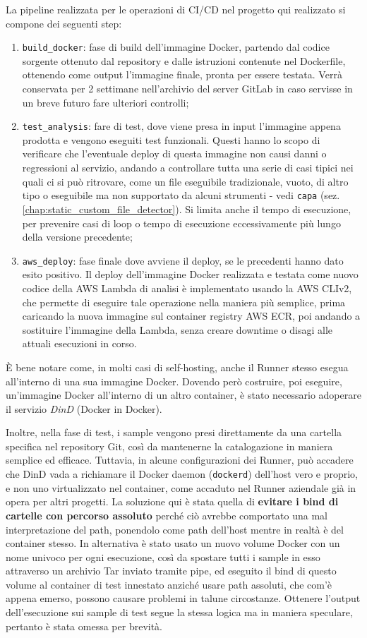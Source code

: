 La pipeline realizzata per le operazioni di CI/CD nel progetto qui realizzato si compone dei seguenti step:
\begin{enumerate}
    \item \texttt{build\_docker}: fase di build dell'immagine Docker, partendo dal codice sorgente ottenuto dal repository e dalle istruzioni contenute nel Dockerfile, ottenendo come output l'immagine finale, pronta per essere testata. Verrà conservata per 2 settimane nell'archivio del server GitLab in caso servisse in un breve futuro fare ulteriori controlli;
    \item \texttt{test\_analysis}: fare di test, dove viene presa in input l'immagine appena prodotta e vengono eseguiti test funzionali.
    Questi hanno lo scopo di verificare che l'eventuale deploy di questa immagine non causi danni o regressioni al servizio, andando a controllare tutta una serie di casi tipici nei quali ci si può ritrovare, come un file eseguibile tradizionale, vuoto, di altro tipo o eseguibile ma non supportato da alcuni strumenti - vedi \texttt{capa} (sez. \ref{chap:static_custom_file_detector}).
    Si limita anche il tempo di esecuzione, per prevenire casi di loop o tempo di esecuzione eccessivamente più lungo della versione precedente;
    \item \texttt{aws\_deploy}: fase finale dove avviene il deploy, se le precedenti hanno dato esito positivo. Il deploy dell'immagine Docker realizzata e testata come nuovo codice della AWS Lambda di analisi è implementato usando la AWS CLIv2, che permette di eseguire tale operazione nella maniera più semplice, prima caricando la nuova immagine sul container registry AWS ECR, poi andando a sostituire l'immagine della Lambda, senza creare downtime o disagi alle attuali esecuzioni in corso.
\end{enumerate}

È bene notare come, in molti casi di self-hosting, anche il Runner stesso esegua all'interno di una sua immagine Docker. Dovendo però costruire, poi eseguire, un'immagine Docker all'interno di un altro container, è stato necessario adoperare il servizio \emph{DinD} (Docker in Docker).

Inoltre, nella fase di test, i sample vengono presi direttamente da una cartella specifica nel repository Git, così da mantenerne la catalogazione in maniera semplice ed efficace.
Tuttavia, in alcune configurazioni dei Runner, può accadere che DinD vada a richiamare il Docker daemon (\texttt{dockerd}) dell'host vero e proprio, e non uno virtualizzato nel container, come accaduto nel Runner aziendale già in opera per altri progetti.
La soluzione qui è stata quella di \textbf{evitare i bind di cartelle con percorso assoluto} perché ciò avrebbe comportato una mal interpretazione del path, ponendolo come path dell'host mentre in realtà è del container stesso.
In alternativa è stato usato un nuovo volume Docker con un nome univoco per ogni esecuzione, così da spostare tutti i sample in esso attraverso un archivio Tar inviato tramite pipe, ed eseguito il bind di questo volume al container di test innestato anziché usare path assoluti, che com'è appena emerso, possono causare problemi in talune circostanze.
Ottenere l'output dell'esecuzione sui sample di test segue la stessa logica ma in maniera speculare, pertanto è stata omessa per brevità.
